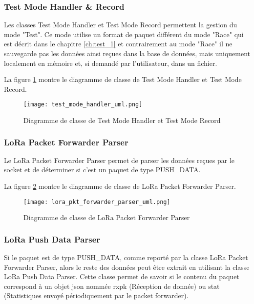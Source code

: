 \subsubsection{Test Mode Handler \& Record}

Les classes Test Mode Handler et Test Mode Record permettent la gestion du mode "Test". Ce mode utilise un format de paquet différent du mode "Race" qui est décrit dans le chapitre \ref{ch:test_1} et contrairement au mode "Race" il ne sauvegarde pas les données ainsi reçues dans la base de données, mais uniquement localement en mémoire et, si demandé par l'utilisateur, dans un fichier.

La figure \ref{fig:test_mode_handler_uml} montre le diagramme de classe de Test Mode Handler et Test Mode Record.

\begin{figure}[htb]
\centering 
\texttt{[image: test\_mode\_handler\_uml.png]} 
\caption{Diagramme de classe de Test Mode Handler et Test Mode Record}
\label{fig:test_mode_handler_uml}
 \end{figure}

\subsubsection{LoRa Packet Forwarder Parser}

Le LoRa Packet Forwarder Parser permet de parser les données reçues par le socket et de déterminer si c'est un paquet de type PUSH\_DATA.

La figure \ref{fig:lora_pkt_forwarder_parser_uml} montre le diagramme de classe de LoRa Packet Forwarder Parser.

\begin{figure}[htb]
\centering 
\texttt{[image: lora\_pkt\_forwarder\_parser\_uml.png]} 
\caption{Diagramme de classe de LoRa Packet Forwarder Parser}
\label{fig:lora_pkt_forwarder_parser_uml}
 \end{figure}

\subsubsection{LoRa Push Data Parser}

Si le paquet est de type PUSH\_DATA, comme reporté par la classe LoRa Packet Forwarder Parser, alors le reste des données peut être extrait en utilisant la classe LoRa Push Data Parser. Cette classe permet de savoir si le contenu du paquet correspond à un objet json nommée rxpk (Réception de donnée) ou stat (Statistiques envoyé périodiquement par le packet forwarder).

